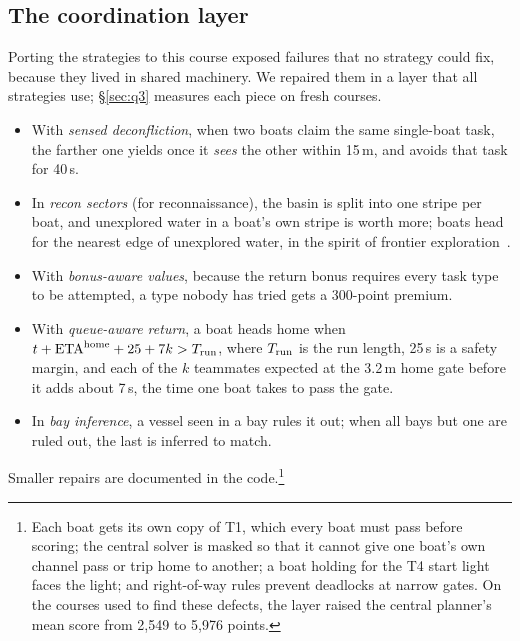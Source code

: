 \documentclass[11pt]{article}
\theoremstyle{definition}
\begin{document}
\subsection*{The coordination layer}\label{sec:layer}
Porting the strategies to this course exposed failures that no strategy could fix, because they lived in shared machinery. We repaired them in a layer that all strategies use; \S\ref{sec:q3} measures each piece on fresh courses.
\begin{itemize}
\item With \emph{sensed deconfliction}, when two boats claim the same single-boat task, the farther one yields once it \emph{sees} the other within 15\,m, and avoids that task for 40\,s.
\item In \emph{recon sectors} (for reconnaissance), the basin is split into one stripe per boat, and unexplored water in a boat's own stripe is worth more; boats head for the nearest edge of unexplored water, in the spirit of frontier exploration~\cite{yamauchi1997,burgard2005}.
\item With \emph{bonus-aware values}, because the return bonus requires every task type to be attempted, a type nobody has tried gets a 300-point premium.
\item With \emph{queue-aware return}, a boat heads home when $t+\mathrm{ETA}^{\rm home}+25+7k>T_{\rm run}$, where $T_{\rm run}$ is the run length, 25\,s is a safety margin, and each of the $k$ teammates expected at the 3.2\,m home gate before it adds about 7\,s, the time one boat takes to pass the gate.
\item In \emph{bay inference}, a vessel seen in a bay rules it out; when all bays but one are ruled out, the last is inferred to match.
\end{itemize}
Smaller repairs are documented in the code.\footnote{Each boat gets its own copy of T1, which every boat must pass before scoring; the central solver is masked so that it cannot give one boat's own channel pass or trip home to another; a boat holding for the T4 start light faces the light; and right-of-way rules prevent deadlocks at narrow gates. On the courses used to find these defects, the layer raised the central planner's mean score from 2{,}549 to 5{,}976 points.}

\end{document}
